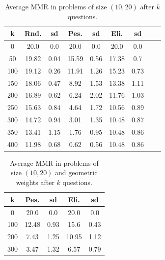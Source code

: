 \documentclass[sigconf, anonymous]{aamas}
\begin{document}
\begin{table}
	\caption{Average MMR in problems of size $(10, 20)$ after $k$ questions.}
	\label{tab:biggerSize}
	\begin{tabular}{S[table-figures-integer=3, table-figures-decimal=0]S[table-number-alignment = right]@{ ± }S[table-number-alignment = left, table-figures-integer=1]S[table-number-alignment = right]@{ ± }S[table-number-alignment = left, table-figures-integer=1]S[table-number-alignment = right]@{ ± }S[table-number-alignment = left, table-figures-integer=1]S[table-number-alignment = right]@{ ± }S[table-number-alignment = left]}
		\toprule
		{k} & {Rnd.} & {sd} & {Pes.} & {sd} & {Eli.} & {sd} \\
		 &20.0 & 0.0 & 20.0 & 0.0&  20.0 & 0.0 \\
		50 & 19.82 & 0.04 &	15.59 &0.56	&17.38& 0.7\\
		100 & 19.12	& 0.26&	11.91&	1.26 &15.23& 0.73\\
		150 & 18.06	& 0.47&	8.92&	1.53 &13.38& 1.11\\
		200 & 16.89	& 0.62&6.24&2.02&11.76& 1.03\\
		250 & 15.63 & 0.84&	4.64&1.72&10.56& 0.89\\
		300 & 14.72	& 0.94&	3.01& 1.35 &10.48& 0.87\\
		350 & 13.41	& 1.15& 1.76& 0.95&10.48& 0.86\\
		400 & 11.98	& 0.68&	0.62&0.56 &10.48& 0.86\\
		\bottomrule
	\end{tabular}
\end{table}
\begin{table}
	\caption{Average MMR in problems of size $(10, 20)$ and geometric weights after $k$ questions.}
	\label{tab:geometricWeights}
	\begin{tabular}{S[table-figures-integer=3, table-figures-decimal=0]S[table-number-alignment = right]@{ ± }S[table-number-alignment = left, table-figures-integer=1]S[table-number-alignment = right]@{ ± }S[table-number-alignment = left, table-figures-integer=1]}
		\toprule
		{k} & {Pes.} & {sd} & {Eli.} & {sd} \\
			&20.0	&0.0	&20.0	&0.0\\
		100	&12.48	&0.93	&15.6	&0.43\\
		200	&7.43	&1.25	&10.95	&1.12\\
		300	&3.47	&1.32	&6.57	&0.79\\
		\bottomrule
	\end{tabular}
\end{table}
\end{document}
